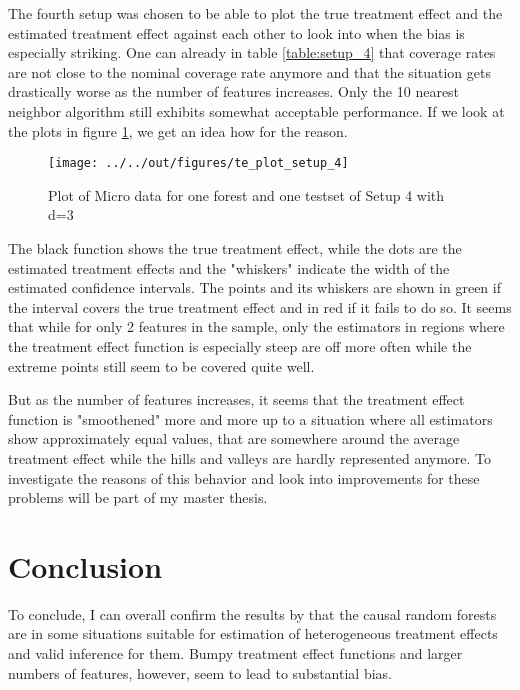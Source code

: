 \documentclass[11pt, a4paper, leqno]{article}
\begin{document}


The fourth setup was chosen to be able to plot the true treatment effect and the estimated treatment effect against each other to look into when the bias is especially striking. One can already in table \ref{table:setup_4} that coverage rates are not close to the nominal coverage rate anymore and that the situation gets drastically worse as the number of features increases. Only the 10 nearest neighbor algorithm still exhibits somewhat acceptable performance. If we look at the plots in figure \ref{fig:setup_4}, we get an idea how for the reason.

\begin{figure}
    \caption{Plot of Micro data for one forest and one testset of Setup 4 with d=3}
    
    \texttt{[image: ../../out/figures/te\_plot\_setup\_4]}
    \label{fig:setup_4}

\end{figure}

The black function shows the true treatment effect, while the dots are the estimated treatment effects and the "whiskers" indicate the width of the estimated confidence intervals. The points and its whiskers are shown in green if the interval covers the true treatment effect and in red if it fails to do so. It seems that while for only 2 features in the sample, only the estimators in regions where the treatment effect function is especially steep are off more often while the extreme points still seem to be covered quite well. 

But as the number of features increases, it seems that the treatment effect function is "smoothened" more and more up to a situation where all estimators show approximately equal values, that are somewhere around the average treatment effect while the hills and valleys are hardly represented anymore.
To investigate the reasons of this behavior and look into improvements for these problems will be part of my master thesis.

\section{Conclusion} %
\label{sec:conclusion}

To conclude, I can overall confirm the results by \cite{wa18} that the causal random forests are in some situations suitable for estimation of heterogeneous treatment effects and valid inference for them. Bumpy treatment effect functions and larger numbers of features, however, seem to lead to substantial bias. 
\end{document}
